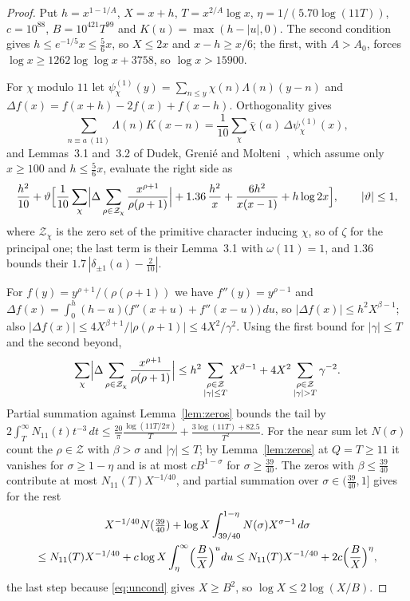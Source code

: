 \documentclass[11pt]{article}
\theoremstyle{remark}
\newcommand{\Zeros}{\mathcal Z}
\begin{document}
\begin{proof}
Put $h=x^{1-1/A}$, $X=x+h$, $T=x^{2/A}\log x$, $\eta=1/(5.70\log(11T))$,
$c=10^{88}$, $B=10^{421}T^{99}$ and $K(u)=\max(h-|u|,0)$.  The second
condition gives $h\le e^{-1/5}x\le\frac56x$, so $X\le2x$ and $x-h\ge x/6$;
the first, with $A>A_0$, forces $\log x\ge1262\log\log x+3758$, so
$\log x>15900$.

For $\chi$ modulo $11$ let
$\psi^{(1)}_\chi(y)=\sum_{n\le y}\chi(n)\Lambda(n)(y-n)$ and
$\Delta f(x)=f(x+h)-2f(x)+f(x-h)$.  Orthogonality gives
\[
  \sum_{n\equiv a\ (11)}\Lambda(n)K(x-n)
  =\frac1{10}\sum_\chi\bar\chi(a)\,\Delta\psi^{(1)}_\chi(x),
\]
and Lemmas~3.1 and~3.2 of Dudek, Greni\'e and Molteni~\cite{dgm}, which
assume only $x\ge100$ and $h\le\frac56x$, evaluate the right side as
\[
  \frac{h^2}{10}+\vartheta\Bigl[\frac1{10}\sum_\chi\Bigl|\Delta
  \sum_{\rho\in\Zeros_\chi}\frac{x^{\rho+1}}{\rho(\rho+1)}\Bigr|
  +1.36\,\frac{h^2}x+\frac{6h^2}{x(x-1)}+h\log2x\Bigr],
  \qquad|\vartheta|\le1,
\]
where $\Zeros_\chi$ is the zero set of the primitive character inducing
$\chi$, so of $\zeta$ for the principal one; the last term is their
Lemma~3.1 with $\omega(11)=1$, and $1.36$ bounds their
$1.7\,|\delta_{\pm1}(a)-\frac2{10}|$.

For $f(y)=y^{\rho+1}/(\rho(\rho+1))$ we have $f''(y)=y^{\rho-1}$ and
$\Delta f(x)=\int_0^h(h-u)\bigl(f''(x+u)+f''(x-u)\bigr)\,du$, so
$|\Delta f(x)|\le h^2X^{\beta-1}$; also
$|\Delta f(x)|\le4X^{\beta+1}/|\rho(\rho+1)|\le4X^2/\gamma^2$.  Using the
first bound for $|\gamma|\le T$ and the second beyond,
\[
  \sum_\chi\Bigl|\Delta\sum_{\rho\in\Zeros_\chi}
  \frac{x^{\rho+1}}{\rho(\rho+1)}\Bigr|
  \le h^2\sum_{\substack{\rho\in\Zeros\\|\gamma|\le T}}X^{\beta-1}
  +4X^2\sum_{\substack{\rho\in\Zeros\\|\gamma|>T}}\gamma^{-2}.
\]
Partial summation against Lemma~\ref{lem:zeros} bounds the tail by
$2\int_T^\infty N_{11}(t)t^{-3}\,dt
\le\frac{20}\pi\frac{\log(11T/2\pi)}T+\frac{3\log(11T)+82.5}{T^2}$.
For the near sum let $N(\sigma)$ count the $\rho\in\Zeros$ with
$\beta>\sigma$ and $|\gamma|\le T$; by Lemma~\ref{lem:zeros} at $Q=T\ge11$
it vanishes for $\sigma\ge1-\eta$ and is at most $cB^{1-\sigma}$ for
$\sigma\ge\frac{39}{40}$.  The zeros with $\beta\le\frac{39}{40}$
contribute at most $N_{11}(T)X^{-1/40}$, and partial summation over
$\sigma\in(\frac{39}{40},1]$ gives for the rest
\begin{multline*}
  X^{-1/40}N(\tfrac{39}{40})
  +\log X\int_{39/40}^{1-\eta}N(\sigma)X^{\sigma-1}\,d\sigma\\
  \le N_{11}(T)X^{-1/40}+c\log X\int_\eta^{\infty}\Bigl(\frac BX\Bigr)^u du
  \le N_{11}(T)X^{-1/40}+2c\Bigl(\frac BX\Bigr)^\eta,
\end{multline*}
the last step because \eqref{eq:uncond} gives $X\ge B^2$, so
$\log X\le2\log(X/B)$.


\end{proof}
\end{document}
